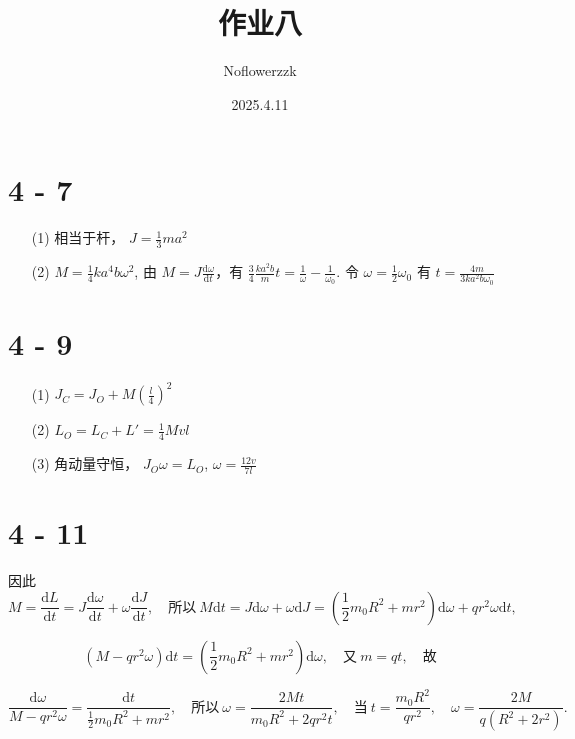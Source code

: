 \documentclass{article}
\title{作业八}
\author{Noflowerzzk}
\date{2025.4.11}
\newcommand{\dd}{\mathrm{d}}
\begin{document}
\maketitle

\section*{4 - 7}

\begin{itemize}
    \item [(1)] 相当于杆， $J = \frac{1}{3}ma^2$
    \item [(2)] $M = \frac{1}{4}ka^4b\omega^2$, 由 $M = J\frac{\dd \omega}{\dd t}$，有 $\frac{3}{4}\frac{ka^2b}{m}t = \frac{1}{\omega} - \frac{1}{\omega_0}$. 令 $\omega = \frac{1}{2}\omega_0$ 有 $t = \frac{4m}{3ka^2b\omega_0}$
\end{itemize}

\section*{4 - 9}

\begin{itemize}
    \item [(1)] $J_C = J_O + M\left(\frac{l}{4}\right)^2$
    \item [(2)] $L_O = L_C + L' = \frac{1}{4}Mvl$
    \item [(3)] 角动量守恒， $J_O\omega = L_O$, $\omega = \frac{12v}{7l}$
\end{itemize}

\section*{4 - 11}

因此
\[
M = \frac{\mathrm{d}L}{\mathrm{d}t} = J \frac{\mathrm{d}\omega}{\mathrm{d}t} + \omega \frac{\mathrm{d}J}{\mathrm{d}t}, \quad
\text{所以} \ M \mathrm{d}t = J \mathrm{d}\omega + \omega \mathrm{d}J = \left( \frac{1}{2} m_0 R^2 + m r^2 \right) \mathrm{d}\omega + q r^2 \omega \mathrm{d}t,
\]

\[
\left( M - q r^2 \omega \right) \mathrm{d}t = \left( \frac{1}{2} m_0 R^2 + m r^2 \right) \mathrm{d}\omega, \quad
\text{又} \ m = q t, \quad
\text{故}
\]

\[
\frac{\mathrm{d}\omega}{M - q r^2 \omega} = \frac{\mathrm{d}t}{\frac{1}{2} m_0 R^2 + m r^2}, \quad
\text{所以} \ \omega = \frac{2 M t}{m_0 R^2 + 2 q r^2 t}, \quad
\text{当} \ t = \frac{m_0 R^2}{q r^2}, \quad
\omega = \frac{2 M}{q (R^2 + 2 r^2)}.
\]
\end{document}
